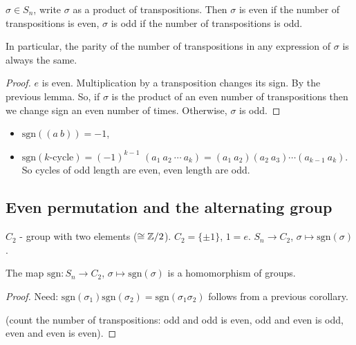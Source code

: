 \documentclass[10pt, a4paper]{article}
\begin{document}
\begin{corollary}
    $\sigma \in S_n$,
    write $\sigma$ as a product of transpositions.
    Then $\sigma$ is even if the number of transpositions is even,
    $\sigma$ is odd if the number of transpositions is odd.

    In particular,
    the parity of the number of transpositions in any expression of $\sigma$ is always the same.

    \begin{proof}
        $e$ is even.
        Multiplication by a transposition changes its sign.
        By the previous lemma.
        So,
        if $\sigma$ is the product of an even number of transpositions then we change sign an even number of times.
        Otherwise,
        $\sigma$ is odd.
    \end{proof}
\end{corollary}

\begin{example}
    \begin{itemize}
        \item $\mathrm{sgn}((a\ b)) = -1$,

        \item $\mathrm{sgn}(k\text{-cycle}) = (-1) ^ {k - 1}$
        $(a_1\ a_2\ \dotsi\ a_k) = (a_1\ a_2)(a_2\ a_3)\dotsi(a_{k - 1}\ a_k)$.
        So cycles of odd length are even,
        even length are odd.
    \end{itemize}
\end{example}

\subsection{Even permutation and the alternating group}

$C_2$ -
group with two elements
($\cong \mathbb{Z} / 2$).
$C_2 = \{\pm 1\}$,
$1 = e$.
$S_n \to C_2$,
$\sigma \mapsto \mathrm{sgn}(\sigma)$.

\begin{lemma}
    The map $\mathrm{sgn} : S_n \to C_2$,
    $\sigma \mapsto \mathrm{sgn}(\sigma)$ is a homomorphism of groups.

    \begin{proof}
        Need:
        $\mathrm{sgn}(\sigma_1)\mathrm{sgn}(\sigma_2) = \mathrm{sgn}(\sigma_1\sigma_2)$ follows from a previous corollary.

        (count the number of transpositions:
        odd and odd is even,
        odd and even is odd,
        even and even is even).
    \end{proof}
\end{lemma}
\end{document}
